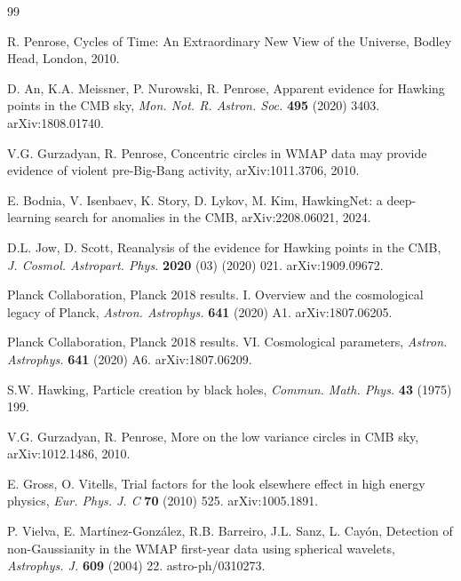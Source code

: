 \documentclass[preprint,12pt,nonatbib]{elsarticle}
\begin{document}

\begin{thebibliography}{99}

R. Penrose,
Cycles of Time: An Extraordinary New View of the Universe,
Bodley Head, London, 2010.

D. An, K.A. Meissner, P. Nurowski, R. Penrose,
Apparent evidence for Hawking points in the CMB sky,
\emph{Mon. Not. R. Astron. Soc.} \textbf{495} (2020) 3403.
arXiv:1808.01740.

V.G. Gurzadyan, R. Penrose,
Concentric circles in WMAP data may provide evidence of violent pre-Big-Bang activity,
arXiv:1011.3706, 2010.

E. Bodnia, V. Isenbaev, K. Story, D. Lykov, M. Kim,
HawkingNet: a deep-learning search for anomalies in the CMB,
arXiv:2208.06021, 2024.

D.L. Jow, D. Scott,
Reanalysis of the evidence for Hawking points in the CMB,
\emph{J. Cosmol. Astropart. Phys.} \textbf{2020} (03) (2020) 021.
arXiv:1909.09672.

Planck Collaboration,
Planck 2018 results. I. Overview and the cosmological legacy of Planck,
\emph{Astron. Astrophys.} \textbf{641} (2020) A1.
arXiv:1807.06205.

Planck Collaboration,
Planck 2018 results. VI. Cosmological parameters,
\emph{Astron. Astrophys.} \textbf{641} (2020) A6.
arXiv:1807.06209.

S.W. Hawking,
Particle creation by black holes,
\emph{Commun. Math. Phys.} \textbf{43} (1975) 199.

V.G. Gurzadyan, R. Penrose,
More on the low variance circles in CMB sky,
arXiv:1012.1486, 2010.

E. Gross, O. Vitells,
Trial factors for the look elsewhere effect in high energy physics,
\emph{Eur. Phys. J. C} \textbf{70} (2010) 525.
arXiv:1005.1891.

P. Vielva, E. Mart\'inez-Gonz\'alez, R.B. Barreiro, J.L. Sanz, L. Cay\'on,
Detection of non-Gaussianity in the WMAP first-year data using spherical wavelets,
\emph{Astrophys. J.} \textbf{609} (2004) 22.
astro-ph/0310273.


\end{thebibliography}
\end{document}
